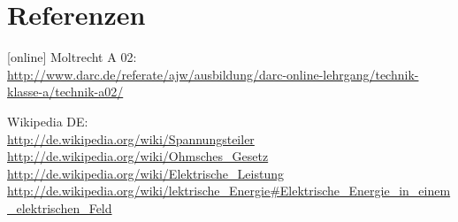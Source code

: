 \section{Referenzen}
\begin{small}
  \begin{thebibliography}{}
      [online]
      Moltrecht A 02: \\
      \url{http://www.darc.de/referate/ajw/ausbildung/darc-online-lehrgang/technik-klasse-a/technik-a02/}

        Wikipedia DE: \\
      \url{http://de.wikipedia.org/wiki/Spannungsteiler}\\
      \url{http://de.wikipedia.org/wiki/Ohmsches_Gesetz}\\
      \url{http://de.wikipedia.org/wiki/Elektrische_Leistung}\\
      \url{http://de.wikipedia.org/wiki/lektrische_Energie#Elektrische_Energie_in_einem_elektrischen_Feld}\\
  \end{thebibliography}
\end{small}


